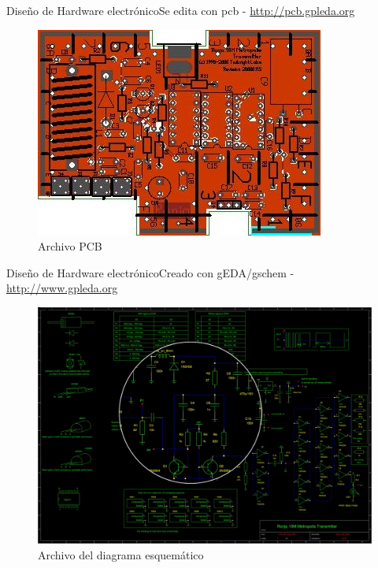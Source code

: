 \documentclass{beamer}
\begin{document}
\begin{frame}{Diseño de Hardware electrónico}{Se edita con \alert{pcb} - \url{http://pcb.gpleda.org}}
  \begin{figure}
    \includegraphics[scale=0.65]{transmisor/metropolis_transmitter}
    \caption{Archivo PCB}
  \end{figure}
\end{frame}

\begin{frame}{Diseño de Hardware electrónico}{Creado con \alert{gEDA/gschem} - \url{http://www.gpleda.org}}
  \begin{figure}
    \includegraphics[scale=0.21]{transmisor/transmisor_esquema}
    \caption{Archivo del diagrama esquemático}
  \end{figure}
\end{frame}
\end{document}
